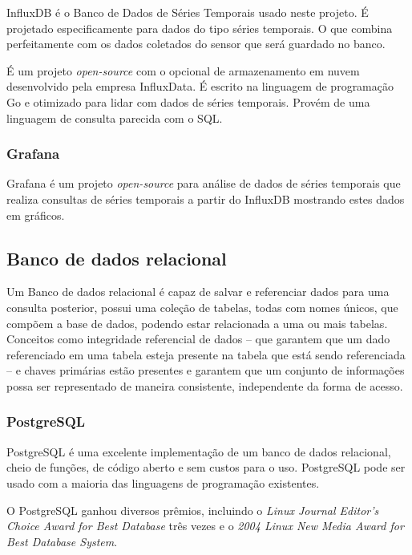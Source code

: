 InfluxDB é o Banco de Dados de Séries Temporais usado neste projeto. É projetado especificamente para dados do tipo séries temporais. O que combina perfeitamente com os dados coletados do sensor que será guardado no banco. \cite{Lundrigan2017}

É um projeto \textit{open-source} com o opcional de armazenamento em nuvem desenvolvido pela empresa InfluxData. É escrito na linguagem de programação Go e otimizado para lidar com dados de séries temporais. Provém de uma linguagem de consulta parecida com o SQL. \cite{Noor2017}

\subsubsection{Grafana}

Grafana é um projeto \textit{open-source} para análise de dados de séries temporais  \cite{Noor2017} que realiza consultas de séries temporais a partir do InfluxDB mostrando estes dados em gráficos.\cite{chang2017kubernetes}

\subsection{Banco de dados relacional}

Um Banco de dados relacional é capaz de salvar e referenciar dados para uma consulta posterior, possui uma coleção de tabelas, todas com nomes únicos, que compõem a base de
dados, podendo estar relacionada a uma ou mais tabelas. Conceitos como integridade referencial de dados – que garantem que um dado referenciado em uma tabela esteja presente na tabela que está sendo referenciada – e chaves primárias estão presentes e garantem que um conjunto de informações possa ser representado de maneira consistente, independente da forma de acesso. \cite{bancosrelacionais}

\subsubsection{PostgreSQL}

PostgreSQL é uma excelente implementação de um banco de dados relacional, cheio de funções, de código aberto e sem custos para o uso. \cite{stones2006beginning}
PostgreSQL pode ser usado com a maioria das linguagens de programação existentes.

O PostgreSQL ganhou diversos prêmios, incluindo o \textit{Linux Journal Editor's Choice Award for Best Database} três vezes e o \textit{2004 Linux New Media Award for Best Database System}.

